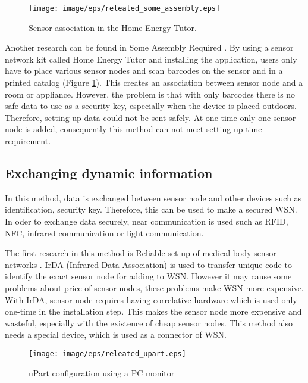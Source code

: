 \begin{figure}[tb]
\centering
\texttt{[image: image/eps/releated\_some\_assembly.eps]}
\caption{Sensor association in the Home Energy Tutor.}
\label{fig:releated_some_assembly}
\end{figure}

Another research can be found in Some Assembly Required  \cite{someassemblyrequired}. By using a sensor network kit called Home Energy Tutor and installing the application, users only have to place various sensor nodes and scan barcodes on the sensor and in a printed catalog (Figure \ref{fig:releated_some_assembly}). This creates an association between sensor node and a room or appliance. However, the problem is that with only barcodes there is no safe data to use as a security key, especially when the device is placed outdoors. Therefore, setting up data could not be sent safely. At one-time only one sensor node is added, consequently this method can not meet setting up time requirement. 

\subsection{Exchanging dynamic information}

In this method, data is exchanged between sensor node and other devices such as identification, security key. Therefore, this can be used to make a secured WSN. In oder to exchange data securely, near communication is used such as RFID, NFC, infrared communication or light communication.

The first research in this method is Reliable set-up of medical body-sensor networks \cite{bodysensor}. IrDA (Infrared Data Association) is used to transfer unique code to identify the exact sensor node for adding to WSN. However it may cause some problems about price of sensor nodes, these problems make WSN more expensive. With IrDA, sensor node requires having correlative hardware which is used only one-time in the installation step. This makes the sensor node more expensive and wasteful, especially with the existence of cheap sensor nodes. This method also needs a special device, which is used as a connector of WSN.

\begin{figure}[tb]
\centering
\texttt{[image: image/eps/releated\_upart.eps]}
\caption{uPart configuration using a PC monitor}
\label{fig:releated_upart}
\end{figure}

